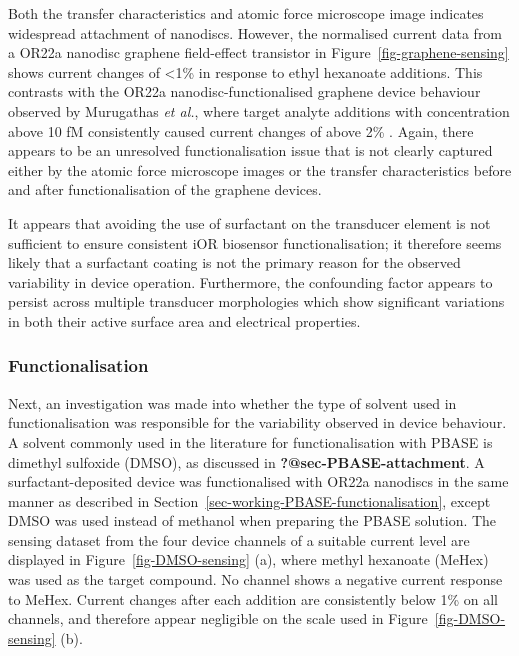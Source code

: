 \documentclass[
  a4paper,
]{scrbook}
\begin{document}
Both the transfer characteristics and atomic force microscope image
indicates widespread attachment of nanodiscs. However, the normalised
current data from a OR22a nanodisc graphene field-effect transistor in
Figure~\ref{fig-graphene-sensing} shows current changes of \textless1\%
in response to ethyl hexanoate additions. This contrasts with the OR22a
nanodisc-functionalised graphene device behaviour observed by Murugathas
\emph{et al.}, where target analyte additions with concentration above
10 fM consistently caused current changes of above 2\%
\autocite{Murugathas2020}. Again, there appears to be an unresolved
functionalisation issue that is not clearly captured either by the
atomic force microscope images or the transfer characteristics before
and after functionalisation of the graphene devices.

It appears that avoiding the use of surfactant on the transducer element
is not sufficient to ensure consistent iOR biosensor functionalisation;
it therefore seems likely that a surfactant coating is not the primary
reason for the observed variability in device operation. Furthermore,
the confounding factor appears to persist across multiple transducer
morphologies which show significant variations in both their active
surface area and electrical properties.

\hypertarget{functionalisation}{%
\subsubsection*{Functionalisation}\label{functionalisation}}

Next, an investigation was made into whether the type of solvent used in
functionalisation was responsible for the variability observed in device
behaviour. A solvent commonly used in the literature for
functionalisation with PBASE is dimethyl sulfoxide (DMSO), as discussed
in \textbf{?@sec-PBASE-attachment}. A surfactant-deposited device was
functionalised with OR22a nanodiscs in the same manner as described in
Section~\ref{sec-working-PBASE-functionalisation}, except DMSO was used
instead of methanol when preparing the PBASE solution. The sensing
dataset from the four device channels of a suitable current level are
displayed in Figure~\ref{fig-DMSO-sensing} (a), where methyl hexanoate
(MeHex) was used as the target compound. No channel shows a negative
current response to MeHex. Current changes after each addition are
consistently below 1\% on all channels, and therefore appear negligible
on the scale used in Figure~\ref{fig-DMSO-sensing} (b).
\end{document}

